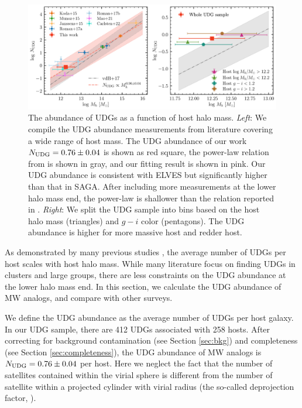 \documentclass[twocolumn,astrosymb,twocolappendix]{aastex631}
\begin{document}
\begin{CJK*}{UTF8}{gbsn}
\begin{figure}
	\vbox{ 
		\centering
		\includegraphics[width=1\linewidth]{N_UDG_host_mass.pdf}
	}
    \caption{The abundance of UDGs as a function of host halo mass. \textit{Left}: We compile the UDG abundance measurements from literature covering a wide range of host mass. The UDG abundance of our work $N_{\rm UDG} = 0.76\pm 0.04$ is shown as red square, the power-law relation from \citet{vdBurg2017} is shown in gray, and our fitting result is shown in pink. Our UDG abundance is consistent with ELVES but significantly higher than that in SAGA. After including more measurements at the lower halo mass end, the power-law is shallower than the relation reported in \citet{vdBurg2017}. \textit{Right}: We split the UDG sample into bins based on the host halo mass (triangles) and $g-i$ color (pentagons). The UDG abundance is higher for more massive host and redder host. }
    \label{fig:n_udg}
\end{figure}

As demonstrated by many previous studies \citep[e.g.,][]{vdBurg2016,vdBurg2017}, the average number of UDGs per host scales with host halo mass. While many literature focus on finding UDGs in clusters and large groups, there are less constraints on the UDG abundance at the lower halo mass end. In this section, we calculate the UDG abundance of MW analogs, and compare with other surveys.

We define the UDG abundance as the average number of UDGs per host galaxy. In our UDG sample, there are 412 UDGs associated with 258 hosts. After correcting for background contamination (see Section \ref{sec:bkg}) and completeness (see Section \ref{sec:completeness}), the UDG abundance of MW analogs is $N_{\rm UDG} = 0.76\pm 0.04$ per host. Here we neglect the fact that the number of satellites contained within the virial sphere is different from the number of satellite within a projected cylinder with virial radius (the so-called deprojection factor, \citealt{vdBurg2017}).


\end{CJK*}
\end{document}
